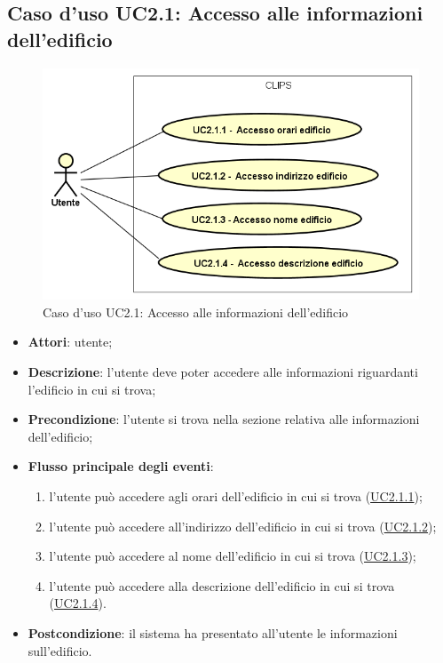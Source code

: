 \documentclass[../AnalisiDeiRequisiti.tex]{subfiles}
\begin{document}
\subsection{Caso d'uso UC2.1: Accesso alle informazioni dell'edificio}

\begin{figure}[H]
	\centering
	\includegraphics[scale=0.95, width=\textwidth]{img/UC2-1.png}
	\caption{Caso d'uso UC2.1: Accesso alle informazioni dell'edificio}\label{fig:UC2.1} 
\end{figure}
\begin{itemize}
	\item \textbf{Attori}: utente;
	\item \textbf{Descrizione}: l'utente deve poter accedere alle informazioni riguardanti l'edificio in cui si trova; 
	\item \textbf{Precondizione}: l'utente si trova nella sezione relativa alle informazioni dell'edificio;
	
	\item \textbf{Flusso principale degli eventi}:
	\begin{enumerate}
		\item l'utente può accedere agli orari dell'edificio in cui si trova (\hyperlink{UC2.1.1}{UC2.1.1});
		\item l'utente può accedere all'indirizzo dell'edificio in cui si trova (\hyperlink{UC2.1.2}{UC2.1.2});
		\item l'utente può accedere al nome dell'edificio in cui si trova (\hyperlink{UC2.1.3}{UC2.1.3});
		\item l'utente può accedere alla descrizione dell'edificio in cui si trova (\hyperlink{UC2.1.4}{UC2.1.4}).
		
	\end{enumerate}
	\item \textbf{Postcondizione}: il sistema ha presentato all'utente le informazioni sull'edificio.
\end{itemize}
\hypertarget{UC2.1.1}{}
\end{document}
